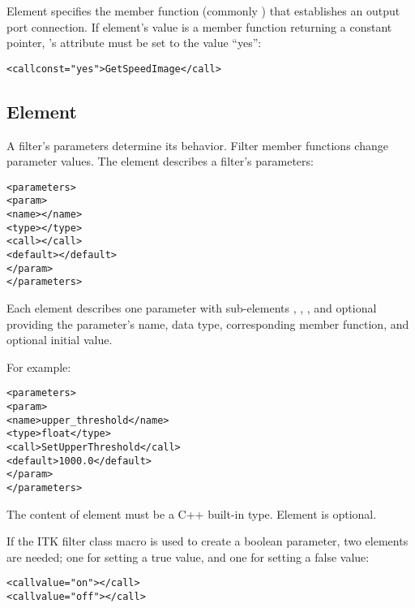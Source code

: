 Element  specifies the member function (commonly
) that establishes an output port connection.  If
 element's value is a member function returning a
constant pointer, 's  attribute
must be set to the value ``yes'':

\begin{alltt}
  <call const="yes">GetSpeedImage</call>
\end{alltt}

\subsection{Element }
\label{sec:itk_mods:param_element}

A filter's parameters determine its behavior.  Filter member functions
change parameter values.  The  element
describes a filter's parameters:

\begin{alltt}
  <parameters>
    <param>
      <name></name>
      <type></type>
      <call></call>
      <default></default>
    </param>
    \velide  
  </parameters>
\end{alltt}

Each  element describes one parameter with
sub-elements , ,
, and optional  providing the
parameter's name, data type, corresponding member function, and
optional initial value.

For example:

\begin{alltt}
  <parameters>
    <param>
      <name>upper\_threshold</name>
      <type>float</type>
      <call>SetUpperThreshold</call>
      <default>1000.0</default>
    </param>
  </parameters>
\end{alltt}

The content of element  must be a C++ built-in 
type.  Element  is optional.

If the ITK filter class macro  is used to create a
boolean parameter, two  elements are needed; one
for setting a true value, and one for setting a false value:

\begin{alltt}
  <call value="on"></call>
  <call value="off"></call>
\end{alltt}

